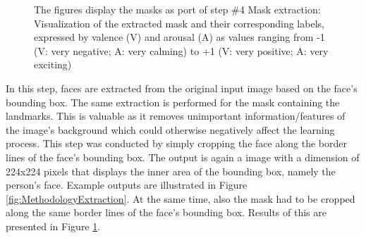 \begin{figure}[htbp]
  \hfill
  \caption[ER pipeline step \#4: Mask extraction]{The figures display the masks as port of step \#4 Mask extraction: Visualization of the extracted mask and their corresponding labels, expressed by valence (V) and arousal (A) as values ranging from -1 (V: very negative; A: very calming) to +1 (V: very positive; A: very exciting)}
  \label{fig:MethodologyExtractionMask}
\end{figure}

\noindent In this step, faces are extracted from the original input image based on the face's bounding box. The same extraction is performed for the mask containing the landmarks. This is valuable as it removes unimportant information/features of the image's background which could otherwise negatively affect the learning process.
\newline\newline
This step was conducted by simply cropping the face along the border lines of the face's bounding box. The output is again a image with a dimension of 224x224 pixels that displays the inner area of the bounding box, namely the person's face. Example outputs are illustrated in Figure \ref{fig:MethodologyExtraction}. At the same time, also the mask had to be cropped along the same border lines of the face's bounding box. Results of this are presented in Figure \ref{fig:MethodologyExtractionMask}.



